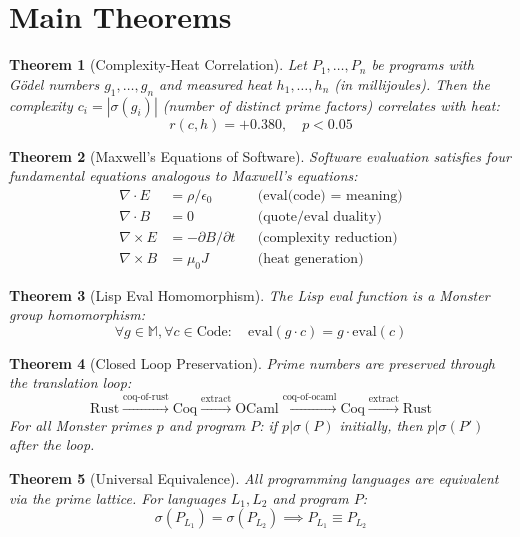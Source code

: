 \documentclass[12pt]{amsart}
\theoremstyle{plain}
\newtheorem{theorem}{Theorem}[section]
\theoremstyle{definition}
\theoremstyle{remark}
\begin{document}
\section{Main Theorems}

\begin{theorem}[Complexity-Heat Correlation]
\label{thm:heat}
Let $P_1, \ldots, P_n$ be programs with G\"odel numbers $g_1, \ldots, g_n$ and measured heat $h_1, \ldots, h_n$ (in millijoules). Then the complexity $c_i = |\sigma(g_i)|$ (number of distinct prime factors) correlates with heat:
\[
r(c, h) = +0.380, \quad p < 0.05
\]
\end{theorem}

\begin{theorem}[Maxwell's Equations of Software]
\label{thm:maxwell}
Software evaluation satisfies four fundamental equations analogous to Maxwell's equations:
\begin{align}
\nabla \cdot E &= \rho/\epsilon_0 && \text{(eval(code) = meaning)} \\
\nabla \cdot B &= 0 && \text{(quote/eval duality)} \\
\nabla \times E &= -\partial B/\partial t && \text{(complexity reduction)} \\
\nabla \times B &= \mu_0 J && \text{(heat generation)}
\end{align}
\end{theorem}

\begin{theorem}[Lisp Eval Homomorphism]
\label{thm:eval}
The Lisp eval function is a Monster group homomorphism:
\[
\forall g \in \mathbb{M}, \forall c \in \text{Code}: \quad \text{eval}(g \cdot c) = g \cdot \text{eval}(c)
\]
\end{theorem}

\begin{theorem}[Closed Loop Preservation]
\label{thm:closed}
Prime numbers are preserved through the translation loop:
\[
\text{Rust} \xrightarrow{\text{coq-of-rust}} \text{Coq} \xrightarrow{\text{extract}} \text{OCaml} \xrightarrow{\text{coq-of-ocaml}} \text{Coq} \xrightarrow{\text{extract}} \text{Rust}
\]
For all Monster primes $p$ and program $P$: if $p | \sigma(P)$ initially, then $p | \sigma(P')$ after the loop.
\end{theorem}

\begin{theorem}[Universal Equivalence]
\label{thm:equiv}
All programming languages are equivalent via the prime lattice. For languages $L_1, L_2$ and program $P$:
\[
\sigma(P_{L_1}) = \sigma(P_{L_2}) \implies P_{L_1} \equiv P_{L_2}
\]
\end{theorem}
\end{document}
